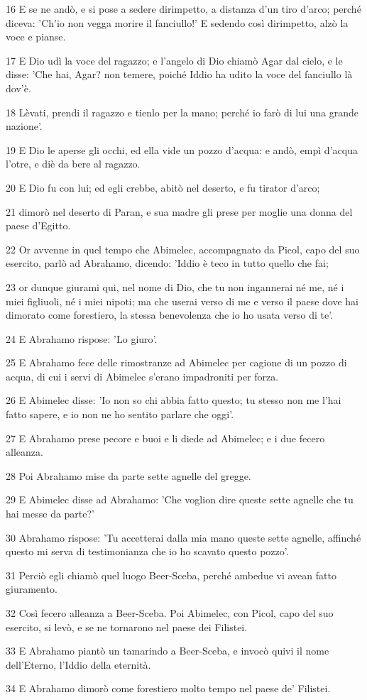 \par 16 E se ne andò, e si pose a sedere dirimpetto, a distanza d'un tiro d'arco; perché diceva: 'Ch'io non vegga morire il fanciullo!' E sedendo così dirimpetto, alzò la voce e pianse.
\par 17 E Dio udì la voce del ragazzo; e l'angelo di Dio chiamò Agar dal cielo, e le disse: 'Che hai, Agar? non temere, poiché Iddio ha udito la voce del fanciullo là dov'è.
\par 18 Lèvati, prendi il ragazzo e tienlo per la mano; perché io farò di lui una grande nazione'.
\par 19 E Dio le aperse gli occhi, ed ella vide un pozzo d'acqua: e andò, empì d'acqua l'otre, e diè da bere al ragazzo.
\par 20 E Dio fu con lui; ed egli crebbe, abitò nel deserto, e fu tirator d'arco;
\par 21 dimorò nel deserto di Paran, e sua madre gli prese per moglie una donna del paese d'Egitto.
\par 22 Or avvenne in quel tempo che Abimelec, accompagnato da Picol, capo del suo esercito, parlò ad Abrahamo, dicendo: 'Iddio è teco in tutto quello che fai;
\par 23 or dunque giurami qui, nel nome di Dio, che tu non ingannerai né me, né i miei figliuoli, né i miei nipoti; ma che userai verso di me e verso il paese dove hai dimorato come forestiero, la stessa benevolenza che io ho usata verso di te'.
\par 24 E Abrahamo rispose: 'Lo giuro'.
\par 25 E Abrahamo fece delle rimostranze ad Abimelec per cagione di un pozzo di acqua, di cui i servi di Abimelec s'erano impadroniti per forza.
\par 26 E Abimelec disse: 'Io non so chi abbia fatto questo; tu stesso non me l'hai fatto sapere, e io non ne ho sentito parlare che oggi'.
\par 27 E Abrahamo prese pecore e buoi e li diede ad Abimelec; e i due fecero alleanza.
\par 28 Poi Abrahamo mise da parte sette agnelle del gregge.
\par 29 E Abimelec disse ad Abrahamo: 'Che voglion dire queste sette agnelle che tu hai messe da parte?'
\par 30 Abrahamo rispose: 'Tu accetterai dalla mia mano queste sette agnelle, affinché questo mi serva di testimonianza che io ho scavato questo pozzo'.
\par 31 Perciò egli chiamò quel luogo Beer-Sceba, perché ambedue vi avean fatto giuramento.
\par 32 Così fecero alleanza a Beer-Sceba. Poi Abimelec, con Picol, capo del suo esercito, si levò, e se ne tornarono nel paese dei Filistei.
\par 33 E Abrahamo piantò un tamarindo a Beer-Sceba, e invocò quivi il nome dell'Eterno, l'Iddio della eternità.
\par 34 E Abrahamo dimorò come forestiero molto tempo nel paese de' Filistei.

